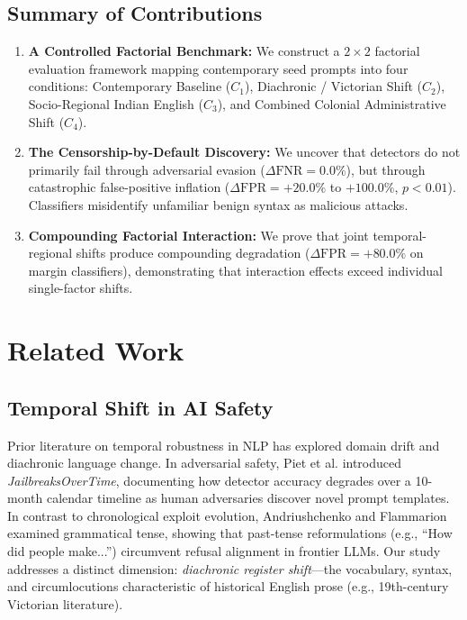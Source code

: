 \documentclass[11pt,a4paper]{article}
\begin{document}
\subsection{Summary of Contributions}
\begin{enumerate}
    \item \textbf{A Controlled Factorial Benchmark:} We construct a $2 \times 2$ factorial evaluation framework mapping contemporary seed prompts into four conditions: Contemporary Baseline ($C_1$), Diachronic / Victorian Shift ($C_2$), Socio-Regional Indian English ($C_3$), and Combined Colonial Administrative Shift ($C_4$).
    \item \textbf{The Censorship-by-Default Discovery:} We uncover that detectors do not primarily fail through adversarial evasion ($\Delta \text{FNR} = 0.0\%$), but through catastrophic false-positive inflation ($\Delta \text{FPR} = +20.0\%$ to $+100.0\%$, $p < 0.01$). Classifiers misidentify unfamiliar benign syntax as malicious attacks.
    \item \textbf{Compounding Factorial Interaction:} We prove that joint temporal-regional shifts produce compounding degradation ($\Delta \text{FPR} = +80.0\%$ on margin classifiers), demonstrating that interaction effects exceed individual single-factor shifts.
\end{enumerate}

\section{Related Work}
\label{sec:related}

\subsection{Temporal Shift in AI Safety}
Prior literature on temporal robustness in NLP has explored domain drift and diachronic language change. In adversarial safety, Piet et al. \cite{piet2025jailbreaksovertime} introduced \textit{JailbreaksOverTime}, documenting how detector accuracy degrades over a 10-month calendar timeline as human adversaries discover novel prompt templates. In contrast to chronological exploit evolution, Andriushchenko and Flammarion \cite{andriushchenko2025refusal} examined grammatical tense, showing that past-tense reformulations (e.g., ``How did people make...'') circumvent refusal alignment in frontier LLMs. Our study addresses a distinct dimension: \textit{diachronic register shift}---the vocabulary, syntax, and circumlocutions characteristic of historical English prose (e.g., 19th-century Victorian literature).
\end{document}
